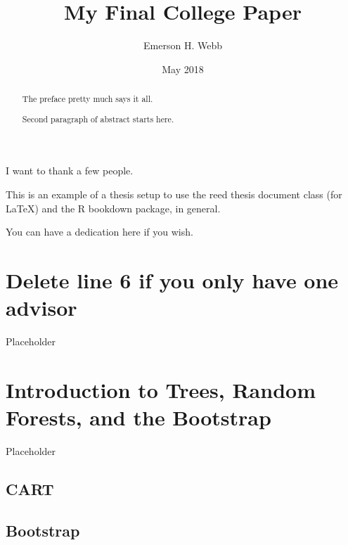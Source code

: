 \documentclass[12pt,twoside]{reedthesis}
\title{My Final College Paper}
\author{Emerson H. Webb}
\date{May 2018}
\theoremstyle{definition}
\theoremstyle{definition}
\theoremstyle{definition}
\theoremstyle{remark}
\begin{document}
  \maketitle

\frontmatter %
\pagestyle{empty} %
  \begin{acknowledgements}
    I want to thank a few people.
  \end{acknowledgements}
  \begin{preface}
    This is an example of a thesis setup to use the reed thesis document
    class (for LaTeX) and the R bookdown package, in general.
  \end{preface}
  \hypersetup{linkcolor=black}
  \setcounter{tocdepth}{2}
  \tableofcontents

  \listoftables

  \listoffigures
  \begin{abstract}
    The preface pretty much says it all. \par
    
    Second paragraph of abstract starts here.
  \end{abstract}
  \begin{dedication}
    You can have a dedication here if you wish.
  \end{dedication}
\mainmatter %
\pagestyle{fancyplain} %

\chapter{Delete line 6 if you only have one
advisor}\label{delete-line-6-if-you-only-have-one-advisor}

Placeholder

\chapter{Introduction to Trees, Random Forests, and the
Bootstrap}\label{rmd-basics}

Placeholder

\section{CART}\label{cart}

\section{Bootstrap}\label{bootstrap}
\end{document}
